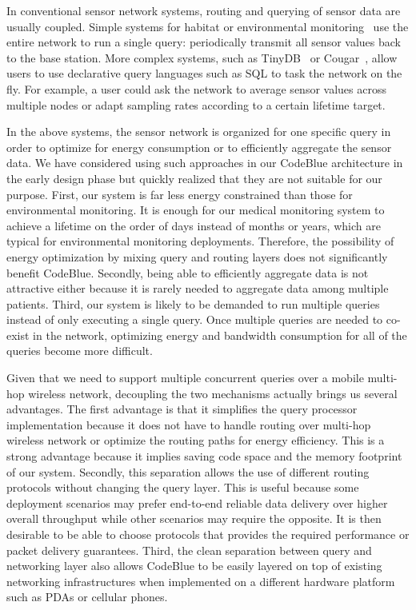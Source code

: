 In conventional sensor network systems, routing and querying of sensor data are
usually coupled. Simple systems for habitat or environmental
monitoring~\cite{gdi,cerpa-habitat,redwoods,burri_dozer:_2007} use
the entire network to run a single query: periodically transmit all sensor
values back to the base station. More complex systems, such as
TinyDB~\cite{tinydb-osdi} or Cougar~\cite{cougar-sigmodrecord}, allow users
to use declarative query languages such as SQL to task the network on the fly.
For example, a user could ask the network to average sensor values across
multiple nodes or adapt sampling rates according to a certain lifetime target.

In the above systems, the sensor network is organized for one specific query
in order to optimize for energy consumption or to efficiently aggregate the
sensor data. We have considered using such approaches in our CodeBlue architecture in
the early design phase but quickly realized that they are not suitable for our
purpose. First, our system is far less energy constrained than those
for environmental monitoring. It is enough for our medical monitoring system
to achieve a lifetime on the order of days instead of months or years, which
are typical for environmental monitoring deployments. Therefore, the
possibility of energy optimization by mixing query and routing layers does not
significantly benefit CodeBlue. Secondly, being able to efficiently aggregate
data is not attractive either because it is rarely needed to aggregate data among
multiple patients. Third, our system is likely to be demanded to run multiple
queries instead of only executing a single query. Once
multiple queries are needed to co-exist in the network, optimizing energy and
bandwidth consumption for all of the queries become more difficult.

Given that we need to support multiple concurrent queries over a mobile
multi-hop wireless network, decoupling the two mechanisms actually brings us
several advantages. The first advantage is that it simplifies the query
processor implementation because it does not have to handle routing over
multi-hop wireless network or optimize the routing paths for energy
efficiency. This is a strong advantage because it implies saving code space
and the memory footprint of our system. Secondly, this separation allows the
use of different routing protocols without changing the query layer. This is
useful because some deployment scenarios may prefer end-to-end reliable data
delivery over higher overall throughput while other scenarios may require the
opposite. It is then desirable to be able to choose protocols that provides
the required performance or packet delivery guarantees. Third, the
clean separation between query and networking layer also allows CodeBlue to
be easily layered on top of existing networking infrastructures when
implemented on a different hardware platform such as PDAs or cellular phones. 

